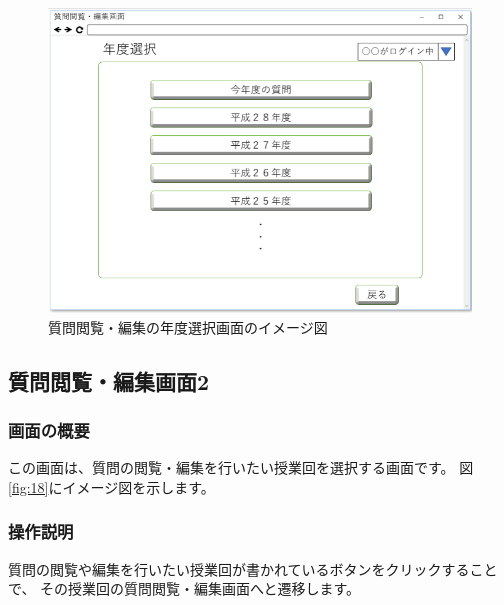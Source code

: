 \begin{figure}[htbp]
  \begin{center}
    \includegraphics[width=1\linewidth,clip]{./img/17.png}
    \caption{質問閲覧・編集の年度選択画面のイメージ図}\label{fig:17}
  \end{center}
\end{figure}

\newpage

\subsection{質問閲覧・編集画面2}
\subsubsection{画面の概要}
この画面は、質問の閲覧・編集を行いたい授業回を選択する画面です。
図\ref{fig:18}にイメージ図を示します。

\subsubsection{操作説明}
質問の閲覧や編集を行いたい授業回が書かれているボタンをクリックすることで、
その授業回の質問閲覧・編集画面へと遷移します。

